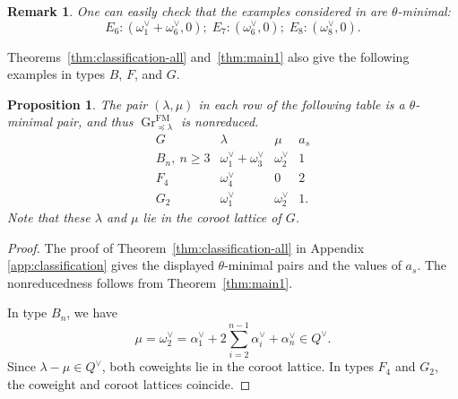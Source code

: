 \documentclass[a4paper, 12pt]{amsart}
\newtheorem{proposition}[theorem]{Proposition}
\newtheorem{remark}[theorem]{Remark}
\theoremstyle{definition}
\DeclareMathOperator{\Gr}{\mathrm{Gr}}
\begin{document}
\begin{remark}
One can easily check that the examples considered in \cite{BHY} are $\theta$-minimal:
\[  E_6:   (\omega_1^\vee+\omega_6^\vee, 0);   \; E_7:  (\omega_6^\vee, 0);   \; E_8: (\omega_8^\vee, 0) .   \]
\end{remark}

Theorems~\ref{thm:classification-all} and~\ref{thm:main1} also give the following examples in types $B$, $F$, and $G$.
\begin{proposition}\label{prop:fold-examples}
The pair $(\lambda, \mu)$ in each row of the following table is a $\theta$-minimal pair, and thus 
$\Gr^{\mathrm{FM}}_{\preceq\lambda}$ is nonreduced.
\[
\begin{array}{c|c|c|c}
G&\lambda&\mu&a_s\\ \hline
B_n,\ n\geq3&\omega_1^\vee+\omega_3^\vee&\omega_2^\vee&1\\
F_4&\omega_4^\vee&0&2\\
G_2&\omega_1^\vee&\omega_2^\vee&1.
\end{array}
\]
Note that these $\lambda$ and $\mu$ lie in the coroot lattice of $G$.
\end{proposition}

\begin{proof}
The proof of Theorem~\ref{thm:classification-all} in
Appendix \ref{app:classification} gives the displayed $\theta$-minimal pairs and the values of $a_s$.
The nonreducedness follows from Theorem~\ref{thm:main1}.

In type $B_n$, we have
\[
\mu=\omega_2^\vee
=\alpha_1^\vee+2\sum_{i=2}^{n-1}\alpha_i^\vee+\alpha_n^\vee
\in Q^\vee.
\]
Since $\lambda-\mu\in Q^\vee$, both coweights lie in the coroot lattice.
In types $F_4$ and $G_2$, the coweight and coroot lattices coincide.
\end{proof}
\end{document}
